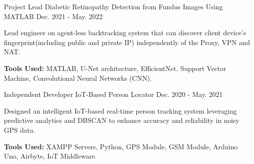 \begin{cventries}
  \cventry
    {Project Lead} %
    {Diabetic Retinopathy Detection from Fundus Images Using MATLAB} %
    {}%
    {Dec. 2021 - May. 2022} %
    {
      \begin{cvitems} %
        \item {Lead engineer on agent-less backtracking system that can discover client device's fingerprint(including public and private IP) independently of the Proxy, VPN and NAT.}
        \item {\textbf{Tools Used:} MATLAB, U-Net architecture, EfficientNet, Support Vector Machine, Convolutional Neural Networks
        (CNN).}
      \end{cvitems}
    }

  \cventry
    {Independent Developer} %
    {IoT-Based Person Locator} %
    {}%
    {Dec. 2020 - May. 2021} %
    {
      \begin{cvitems} %
        \item {Designed an intelligent IoT-based real-time person tracking system leveraging predictive analytics and DBSCAN
        to enhance accuracy and reliability in noisy GPS data.}
        \item {\textbf{Tools Used:} XAMPP Servers, Python, GPS Module, GSM Module, Arduino Uno, Airbyte, IoT Middleware.}
      \end{cvitems}
    }

\end{cventries}
